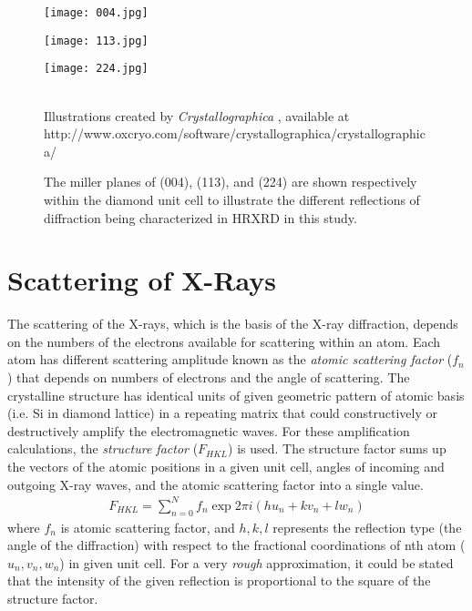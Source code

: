 \begin{figure}[h]
\caption{The miller planes of (004), (113), and (224) are shown respectively within the diamond unit cell to illustrate the different reflections of diffraction being characterized in HRXRD in this study.}
\label{reflections}
\centering
\begin{minipage}{0.25\linewidth}
\texttt{[image: 004.jpg]}
\end{minipage}\begin{minipage}{0.30\linewidth}
\texttt{[image: 113.jpg]}
\end{minipage}\begin{minipage}{0.30\linewidth}
\texttt{[image: 224.jpg]}
\end{minipage}\\
Illustrations created by \emph{Crystallographica} \cite{Siegrist1}, available at http://www.oxcryo.com/software/crystallographica/crystallographica/
\end{figure}

	\section{Scattering of X-Rays}

The scattering of the X-rays, which is the basis of the X-ray diffraction, depends on the numbers of the electrons available for scattering within an atom.  Each atom has different scattering amplitude known as the \emph{atomic scattering factor} ($f_n$) that depends on numbers of electrons and the angle of scattering. The crystalline structure has identical units of given geometric pattern of atomic basis (i.e. Si in diamond lattice)  in a repeating matrix that could constructively or destructively amplify the electromagnetic waves.  For these amplification calculations, the \emph{structure factor} ($F_{HKL}$) is used.  The structure factor sums up the vectors of the atomic positions in a given unit cell, angles of incoming and outgoing X-ray waves, and the atomic scattering factor into a single value.  
\begin{align}
F_{HKL} = \sum^N_{n=0} f_n \exp 2\pi i (hu_n +kv_n + lw_n)
\end{align}
where $f_n$ is atomic scattering factor, and $h,k,l$ represents the reflection type (the angle of the diffraction) with respect to the fractional coordinations of nth atom  ($u_n,v_n,w_n$) in given unit cell.  For a very \emph{rough} approximation, it could be stated that the intensity of the given reflection is proportional to the square of the structure factor.  


